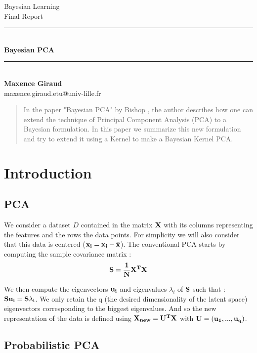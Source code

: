 \documentclass{article}
\newcommand{\HRule}{\rule{\linewidth}{0.2mm}}
\begin{document}
\begin{minipage}{\textwidth}
    \begin{center}
        \Large Bayesian Learning\\
        \large Final Report\\
        \HRule\\
        \vspace{0.3cm}
        {\huge \textbf{Bayesian PCA}}\\
        \HRule\\
        \vspace{1em}
            \textbf{Maxence Giraud}\\
            maxence.giraud.etu@univ-lille.fr\\
    \end{center}
\end{minipage}

\begin{abstract}
    In the paper "Bayesian PCA" by Bishop \cite{bishop1999bayesian}, the author describes how one can extend the technique of Principal Component Analysis (PCA) to a Bayesian formulation. In this paper we summarize this new formulation and try to extend it using a Kernel to make a Bayesian Kernel PCA.
\end{abstract}


\section{Introduction}

\subsection{PCA}
We consider a dataset $D$ contained in the matrix $\bf{X}$ with its columns representing the features and the rows the data points. For simplicity we will also consider that this data is centered ($\bf{x_i} = \bf{x_i} - \bar x$).
The conventional PCA starts by computing the sample covariance matrix : 
$$ \bf{S} = \dfrac{1}{N} \bf{X}^T \bf{X}$$

We then compute the eigenvectors $\bf{u_i}$ and eigenvalues $\lambda_i$ of $\bf{S}$ such that : $\bf{S}\bf{u_i} =\bf{S}\lambda_i $.  We only retain the q (the desired dimensionality of the latent space) eigenvectors corresponding to the biggest eigenvalues. And so the new representation of the data is defined using $\bf{X_{new}} = \bf{U}^T \bf{X}$ with $\bf{U} = (\bf{u_1},...,\bf{u_q})$.

\subsection{Probabilistic PCA}
\end{document}
